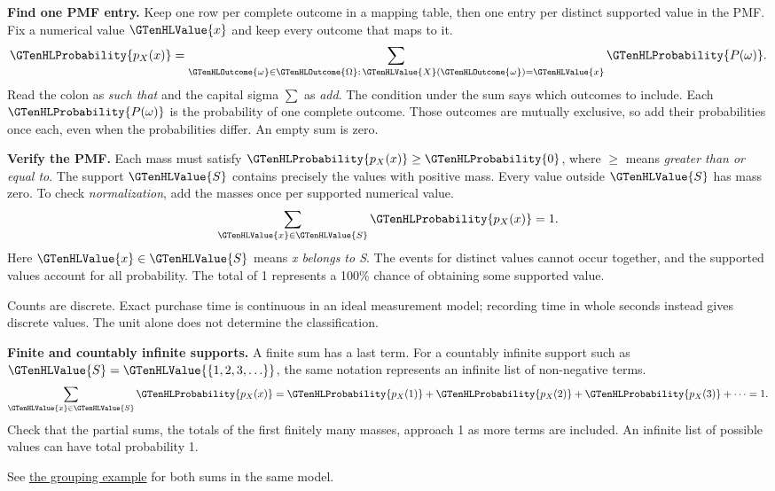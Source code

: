 \textbf{Find one PMF entry.} Keep one row per complete outcome in a mapping table, then one entry per distinct supported value in the PMF. Fix a numerical value $\GTenHLValue{x}$ and keep every outcome that maps to it.
\[
\GTenHLProbability{p_{X}(x)}
=\sum_{\GTenHLOutcome{\omega}\in\GTenHLOutcome{\Omega}:\,\GTenHLValue{X}(\GTenHLOutcome{\omega})=\GTenHLValue{x}}\GTenHLProbability{P(\omega)}.
\]
Read the colon as \emph{such that} and the capital sigma $\sum$ as \emph{add}. The condition under the sum says which outcomes to include. Each $\GTenHLProbability{P(\omega)}$ is the probability of one complete outcome. Those outcomes are mutually exclusive, so add their probabilities once each, even when the probabilities differ. An empty sum is zero.

\textbf{Verify the PMF.} Each mass must satisfy $\GTenHLProbability{p_{X}(x)}\geq\GTenHLProbability{0}$, where $\geq$ means \emph{greater than or equal to}. The support $\GTenHLValue{S}$ contains precisely the values with positive mass. Every value outside $\GTenHLValue{S}$ has mass zero. To check \emph{normalization}, add the masses once per supported numerical value.
\[
\sum_{\GTenHLValue{x}\in\GTenHLValue{S}}\GTenHLProbability{p_{X}(x)}=1.
\]
Here $\GTenHLValue{x}\in\GTenHLValue{S}$ means \emph{x belongs to S}. The events for distinct values cannot occur together, and the supported values account for all probability. The total of 1 represents a 100\% chance of obtaining some supported value.

Counts are discrete. Exact purchase time is continuous in an ideal measurement model; recording time in whole seconds instead gives discrete values. The unit alone does not determine the classification.

\textbf{Finite and countably infinite supports.} A finite sum has a last term. For a countably infinite support such as $\GTenHLValue{S}=\GTenHLValue{\{1,2,3,\ldots\}}$, the same notation represents an infinite list of non-negative terms.
\[
\sum_{\GTenHLValue{x}\in\GTenHLValue{S}}\GTenHLProbability{p_{X}(x)}=\GTenHLProbability{p_{X}(1)}+\GTenHLProbability{p_{X}(2)}+\GTenHLProbability{p_{X}(3)}+\cdots=1.
\]
Check that the partial sums, the totals of the first finitely many masses, approach 1 as more terms are included. An infinite list of possible values can have total probability 1.

See \hyperref[subsec:t2-c1-introductory-general-problem-grouping-outcomes]{the grouping example} for both sums in the same model.


